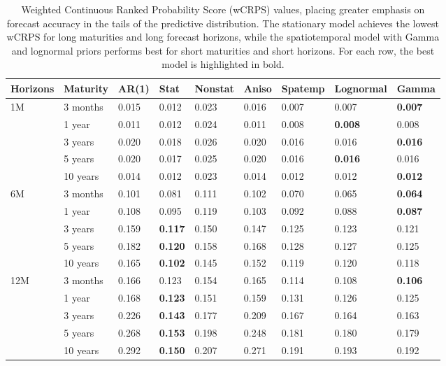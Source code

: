 \documentclass[
  12pt]{article}
\begin{document}
\begin{table}[t!p]
    \centering
    \caption{Weighted Continuous Ranked Probability Score (wCRPS) values, placing greater emphasis on forecast accuracy in the tails of the predictive distribution. The stationary model achieves the lowest wCRPS for long maturities and long forecast horizons, while the spatiotemporal model with Gamma and lognormal priors performs best for short maturities and short horizons. For each row, the best model is highlighted in bold.}
    \begin{tabular}{l l l l l l l l l }
    \hline
        Horizons & Maturity & AR(1) & Stat & Nonstat & Aniso & Spatemp & Lognormal & Gamma \\ \hline
        1M & 3 months & 0.015 & 0.012 & 0.023 & 0.016 & 0.007 & 0.007 & \textbf{0.007} \\ 
        ~ & 1 year & 0.011 & 0.012 & 0.024 & 0.011 & 0.008 & \textbf{0.008} & 0.008 \\ 
        ~ & 3 years & 0.020 & 0.018 & 0.026 & 0.020 & 0.016 & 0.016 & \textbf{0.016} \\ 
        ~ & 5 years & 0.020 & 0.017 & 0.025 & 0.020 & 0.016 & \textbf{0.016} & 0.016 \\ 
        ~ & 10 years & 0.014 & 0.012 & 0.023 & 0.014 & 0.012 & 0.012 & \textbf{0.012} \\ \hline
        6M & 3 months & 0.101 & 0.081 & 0.111 & 0.102 & 0.070 & 0.065 & \textbf{0.064} \\ 
        ~ & 1 year & 0.108 & 0.095 & 0.119 & 0.103 & 0.092 & 0.088 & \textbf{0.087} \\ 
        ~ & 3 years & 0.159 & \textbf{0.117} & 0.150 & 0.147 & 0.125 & 0.123 & 0.121 \\ 
        ~ & 5 years & 0.182 & \textbf{0.120} & 0.158 & 0.168 & 0.128 & 0.127	& 0.125 \\ 
        ~ & 10 years & 0.165 & \textbf{0.102} & 0.145 & 0.152 & 0.119 & 0.120 & 0.118 \\ \hline
        12M & 3 months & 0.166 & 0.123 & 0.154 & 0.165 & 0.114 & 0.108 & \textbf{0.106} \\ 
        ~ & 1 year & 0.168 & \textbf{0.123} & 0.151 & 0.159 & 0.131 & 0.126 & 0.125 \\ 
        ~ & 3 years & 0.226 & \textbf{0.143} & 0.177 & 0.209 & 0.167 & 0.164	& 0.163 \\ 
        ~ & 5 years & 0.268 & \textbf{0.153} & 0.198 & 0.248 & 0.181 & 0.180 & 0.179 \\ 
        ~ & 10 years & 0.292 & \textbf{0.150} & 0.207 & 0.271 & 0.191 & 0.193 & 0.192 \\ \hline
    \end{tabular}
    \label{wcrps}
\end{table}
\end{document}
